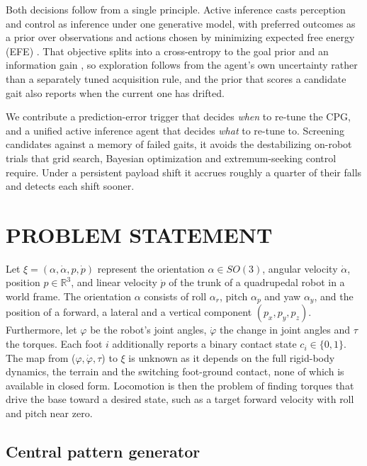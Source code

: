 \documentclass[lettersize,journal]{IEEEtran}
\begin{document}
Both decisions follow from a single principle.
Active inference casts perception and control as inference under one generative model, with preferred outcomes as a prior over observations and actions chosen by minimizing expected free energy (EFE) \cite{friston2015active, dacosta2020active}.
That objective splits into a cross-entropy to the goal prior and an information gain \cite{koudahl2021on, kouw2023information}, so exploration follows from the agent's own uncertainty rather than a separately tuned acquisition rule, and the prior that scores a candidate gait also reports when the current one has drifted.

We contribute a prediction-error trigger that decides \emph{when} to re-tune the CPG, and a unified active inference agent that decides \emph{what} to re-tune to.
Screening candidates against a memory of failed gaits, it avoids the destabilizing on-robot trials that grid search, Bayesian optimization and extremum-seeking control require.
Under a persistent payload shift it accrues roughly a quarter of their falls and detects each shift sooner.

\section{PROBLEM STATEMENT}
\label{sec:problem}

Let $\xi = (\alpha, \dot{\alpha}, p, \dot{p})$ represent the orientation $\alpha \in SO(3)$, angular velocity $\dot{\alpha}$, position $p \in \mathbb{R}^3$, and linear velocity $\dot{p}$ of the trunk of a quadrupedal robot in a world frame.
The orientation $\alpha$ consists of roll $\alpha_r$, pitch $\alpha_p$ and yaw $\alpha_y$, and the position of a forward, a lateral and a vertical component $(p_x, p_y, p_z)$. 
Furthermore, let $\varphi$ be the robot's joint angles, $\dot{\varphi}$ the change in joint angles and $\tau$ the torques. Each foot $i$ additionally reports a binary contact state $c_i \in \{0,1\}$.
The map from ($\varphi, \dot{\varphi}, \tau$) to $\xi$ is unknown as it depends on the full rigid-body dynamics, the terrain and the switching foot-ground contact, none of which is available in closed form.
%
Locomotion is then the problem of finding torques that drive the base toward a desired state, such as a target forward velocity with roll and pitch near zero. 

\subsection{Central pattern generator}
\label{sec:cpg}
\end{document}
